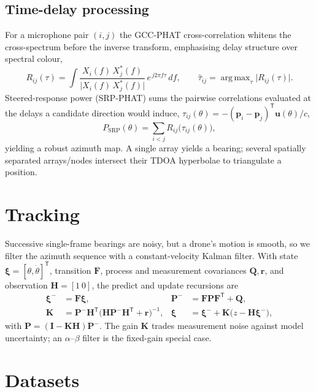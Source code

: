 \documentclass[11pt]{article}
\newcommand{\T}{^{\mathsf{T}}}
\newcommand{\pv}{\mathbf{p}}
\newcommand{\uv}{\mathbf{u}}
\DeclareMathOperator*{\argmax}{arg\,max}
\begin{document}
\subsection{Time-delay processing}
For a microphone pair $(i,j)$ the GCC-PHAT cross-correlation whitens the
cross-spectrum before the inverse transform, emphasising delay structure over
spectral colour,
\begin{equation}
R_{ij}(\tau) = \int \frac{X_i(f)\,X_j^{*}(f)}{\big|X_i(f)\,X_j^{*}(f)\big|}\,
e^{\,j2\pi f\tau}\,df,
\qquad
\hat{\tau}_{ij} = \argmax_{\tau} \big|R_{ij}(\tau)\big|.
\label{eq:gcc}
\end{equation}
Steered-response power (SRP-PHAT) sums the pairwise correlations evaluated at the
delays a candidate direction would induce,
$\tau_{ij}(\theta) = -(\pv_i-\pv_j)\T\uv(\theta)/c$,
\begin{equation}
P_{\mathrm{SRP}}(\theta) = \sum_{i<j} R_{ij}\!\big(\tau_{ij}(\theta)\big),
\end{equation}
yielding a robust azimuth map. A single array yields a bearing; several spatially
separated arrays/nodes intersect their TDOA hyperbolae to triangulate a position.

\section{Tracking}
\label{sec:track}
Successive single-frame bearings are noisy, but a drone's motion is smooth, so we
filter the azimuth sequence with a constant-velocity Kalman filter. With state
$\boldsymbol{\xi}=[\theta,\dot\theta]\T$, transition $\mathbf{F}$, process and
measurement covariances $\mathbf{Q},\mathbf{r}$, and observation
$\mathbf{H}=[1\ 0]$, the predict and update recursions are
\begin{align}
\boldsymbol{\xi}^- &= \mathbf{F}\boldsymbol{\xi}, &
\mathbf{P}^- &= \mathbf{F}\mathbf{P}\mathbf{F}\T + \mathbf{Q},\\
\mathbf{K} &= \mathbf{P}^-\mathbf{H}\T\big(\mathbf{H}\mathbf{P}^-\mathbf{H}\T + \mathbf{r}\big)^{-1}, &
\boldsymbol{\xi} &= \boldsymbol{\xi}^- + \mathbf{K}\big(z-\mathbf{H}\boldsymbol{\xi}^-\big),
\end{align}
with $\mathbf{P}=(\mathbf{I}-\mathbf{K}\mathbf{H})\mathbf{P}^-$. The gain
$\mathbf{K}$ trades measurement noise against model uncertainty; an
$\alpha$--$\beta$ filter is the fixed-gain special case.

\section{Datasets}
\label{sec:data}
\end{document}

